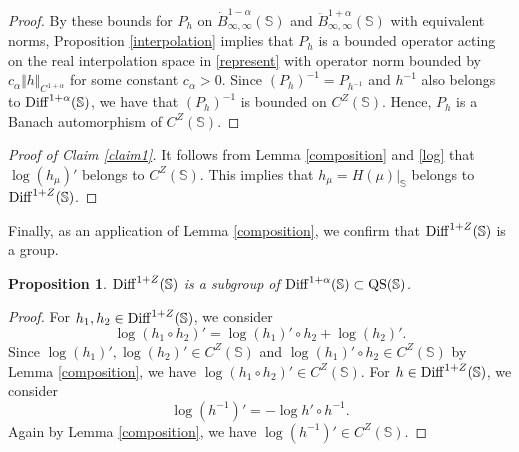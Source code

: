 \documentclass[amstex]{amsart}
\newtheorem{proposition}[theorem]{Proposition}
\theoremstyle{definition}
\theoremstyle{remark}
\numberwithin{equation}{section}
\begin{document}
\begin{proof}
By these bounds for $P_h$ on $\dot B^{1-\alpha}_{\infty,\infty}(\mathbb S)$ and $\ddot B^{1+\alpha}_{\infty,\infty}(\mathbb S)$
with equivalent norms, Proposition \ref{interpolation} implies that $P_h$ is a bounded operator acting on the real interpolation 
space in \eqref{represent} with operator norm bounded by
$c_\alpha \Vert h \Vert_{C^{1+\alpha}}$ for some constant $c_\alpha>0$.
Since $(P_h)^{-1}=P_{h^{-1}}$ and $h^{-1}$ also belongs to ${\rm Diff}^{1+\alpha}(\mathbb S)$,
we have that $(P_h)^{-1}$ is bounded on $C^Z(\mathbb S)$. 
Hence, $P_h$ is a Banach automorphism of $C^Z(\mathbb S)$.
\end{proof}

\begin{proof}[Proof of Claim \ref{claim1}]
It follows from Lemma \ref{composition} and \eqref{log} that $\log (h_\mu)'$ belongs to $C^Z(\mathbb S)$. 
This implies that $h_\mu=H(\mu)|_{\mathbb S}$ belongs to ${\rm Diff}^{1+Z}(\mathbb S)$.
\end{proof}

Finally, as an application of Lemma \ref{composition}, we confirm that 
${\rm Diff}^{1+Z}(\mathbb S)$ is a group.

\begin{proposition}\label{group}
${\rm Diff}^{1+Z}(\mathbb S)$ is a subgroup of ${\rm Diff}^{1+\alpha}(\mathbb S) \subset {\rm QS}(\mathbb S)$.
\end{proposition}

\begin{proof}
For $h_1, h_2 \in {\rm Diff}^{1+Z}(\mathbb S)$, we consider
$$
\log (h_1 \circ h_2)'=\log (h_1)' \circ h_2+\log (h_2)'.
$$
Since $\log (h_1)', \log (h_2)' \in C^Z(\mathbb S)$ and $\log (h_1)' \circ h_2 \in C^Z(\mathbb S)$
by Lemma \ref{composition}, we have $\log (h_1 \circ h_2)' \in C^Z(\mathbb S)$. 
For $h \in {\rm Diff}^{1+Z}(\mathbb S)$, we consider
$$
\log (h^{-1})'=-\log h' \circ h^{-1}.
$$
Again by Lemma \ref{composition}, we have $\log (h^{-1})' \in C^Z(\mathbb S)$.
\end{proof}
\end{document}
